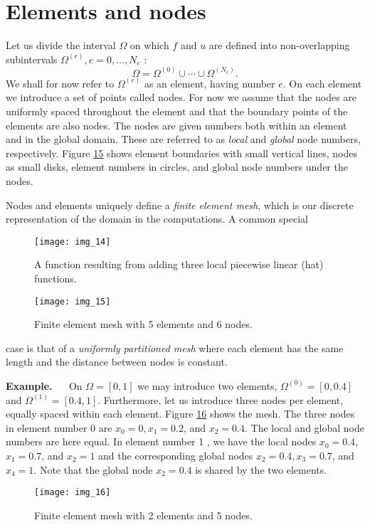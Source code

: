 \documentclass[../main.tex]{subfiles}
\begin{document}
\section[Elements and nodes]{Elements and nodes}
\label{sec:sec_3_1}
Let us divide the interval $\Omega$ on which $f$ and $u$ are defined into non-overlapping subintervals $\Omega^{(e)}, e=0, \ldots, N_{e}$ :
\begin{equation}\label{eqa51}
	\Omega=\Omega^{(0)} \cup \cdots \cup \Omega^{\left(N_{c}\right)}.
\end{equation}
We shall for now refer to $\Omega^{(e)}$ as an element, having number $e$. On each element we introduce a set of points called nodes. For now we assume that the nodes are uniformly spaced throughout the element and that the boundary points of the elements are also nodes. The nodes are given numbers both within an element and in the global domain. These are referred to as \textit{local} and \textit{global} node numbers, respectively. Figure \hyperref[fig:img_15]{15} shows element boundaries with small vertical lines, nodes as small disks, element numbers in circles, and global node numbers under the nodes.

Nodes and elements uniquely define a \textit{finite element mesh}, which is our discrete representation of the domain in the computations. A common special
\begin{figure}[H]
	\centering
	\texttt{[image: img\_14]}
	\caption{A function resulting from adding three local piecewise linear (hat)
		functions.}
	\label{fig:img_14}
\end{figure}
\begin{figure}[H]
	\centering
	\texttt{[image: img\_15]}
	\caption{Finite element mesh with 5 elements and 6 nodes.}
	\label{fig:img_15}
\end{figure}

\noindent case is that of a \textit{uniformly partitioned mesh} where each element has the same
length and the distance between nodes is constant.

\noindent \textbf{Example.} $\quad$ On $\Omega=[0,1]$ we may introduce two elements, $\Omega^{(0)}=[0,0.4]$ and $\Omega^{(1)}=[0.4,1]$. Furthermore, let us introduce three nodes per element, equally spaced within each element. Figure \hyperref[fig:img_16]{16} shows the mesh. The three nodes in element number 0 are $x_{0}=0, x_{1}=0.2$, and $x_{2}=0.4$. The local and global node numbers are here equal. In element number 1 , we have the local nodes $x_{0}=0.4$, $x_{1}=0.7$, and $x_{2}=1$ and the corresponding global nodes $x_{2}=0.4, x_{3}=0.7$, and $x_{4}=1$. Note that the global node $x_{2}=0.4$ is shared by the two elements.
\begin{figure}[H]
	\centering
	\texttt{[image: img\_16]}
	\caption{Finite element mesh with 2 elements and 5 nodes.}
	\label{fig:img_16}
\end{figure}
\end{document}
